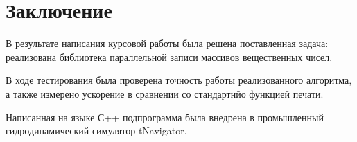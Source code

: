 \section{Заключение}
В результате написания курсовой работы была решена поставленная задача: 
реализована библиотека параллельной записи массивов вещественных чисел.

В ходе тестирования была проверена точность работы реализованного алгоритма, а также измерено ускорение в сравнении со стандартнйо функцией печати. 

Написанная на языке \textsf{С++} подпрограмма была внедрена в промышленный гидродинамический симулятор \textsf{tNavigator}.

